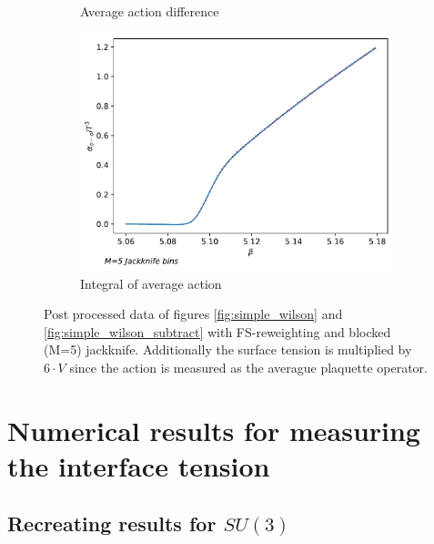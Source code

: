 \documentclass[english,twoside,openright]{UH_TCM_MSc}
\begin{document}
\begin{figure}[htpb]
\begin{subfigure}[t]{0.65\textwidth}
        \caption{Average action difference}
        \label{fig:fs-reweight-difference}
    \end{subfigure}
    \begin{subfigure}[t]{0.65\textwidth}
        \centering
        \includegraphics[width=\textwidth]{final_plots/su3_fs_reweight/integral.pdf}
        \caption{Integral of average action}
        \label{fig:fs-reweight-integral}
    \end{subfigure}
    \caption{Post processed data of figures \ref{fig:simple_wilson} and \ref{fig:simple_wilson_subtract} with FS-reweighting and blocked (M=5) jackknife. Additionally the surface tension is multiplied by $6\cdot V$ since the action is measured as the averague plaquette operator.}
    \label{fig:FS-example}
\end{figure}

\chapter{Numerical results for measuring the interface tension}

\section{Recreating results for $SU(3)$}
\end{document}
